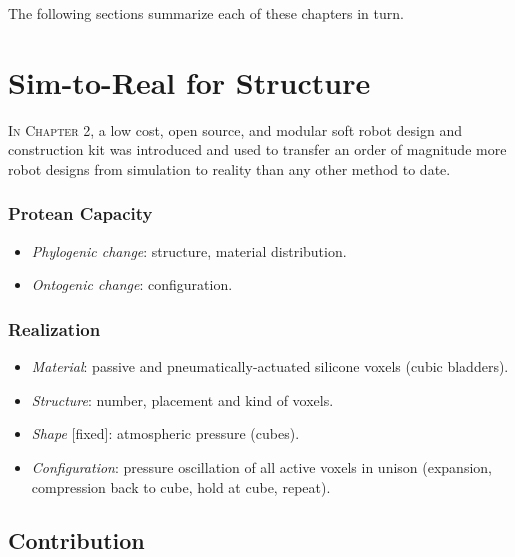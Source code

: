 The following sections summarize each of these 
chapters in turn.


\section{Sim-to-Real for Structure}

\textsc{In Chapter 2,}
a low cost, open source, and modular soft robot design and construction kit was introduced and used to
transfer an order of magnitude more robot designs from simulation to reality than any other method to date.

\subsubsection*{Protean Capacity}

\begin{itemize}
    \item \textit{Phylogenic change}: structure, material distribution.
    \item \textit{Ontogenic change}: configuration.
\end{itemize}

\subsubsection*{Realization}

\begin{itemize}
    \item \textit{Material}: passive and pneumatically-actuated silicone voxels (cubic bladders).
    \item \textit{Structure}: number, placement and kind of voxels.
    \item \textit{Shape} [fixed]: atmospheric pressure (cubes).
    \item \textit{Configuration}: pressure oscillation of all active voxels in unison (expansion, compression back to cube, hold at cube, repeat).
\end{itemize}



\subsection{Contribution}


